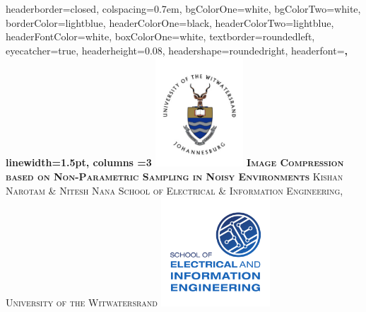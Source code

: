 \documentclass[landscape,a0paper,fontscale=0.5]{baposter} %
\begin{document}
\begin{poster}
{
headerborder=closed, %
colspacing=0.7em, %
bgColorOne=white, %
bgColorTwo=white, %
borderColor=lightblue, %
headerColorOne=black, %
headerColorTwo=lightblue, %
headerFontColor=white, %
boxColorOne=white, %
textborder=roundedleft, %
eyecatcher=true, %
headerheight=0.08\textheight, %
headershape=roundedright, %
headerfont=\Large\bf\textsc, %
linewidth=1.5pt, %
columns =3
}
%
{\includegraphics[height=11em]{wits.jpg}} %
{\bf\textsc{Image Compression based on Non-Parametric Sampling in Noisy Environments}\vspace{0.3em}} %
{\textsc{Kishan Narotam \& Nitesh Nana \hspace{12pt} {\small School of Electrical \& Information Engineering, University of the Witwatersrand}}} %
	{\includegraphics[height=11em]{EIE.pdf}} %


\end{poster}
\end{document}
